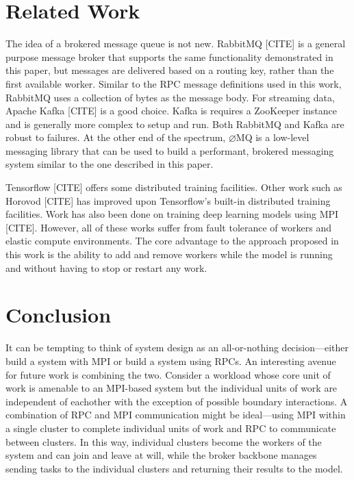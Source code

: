 \documentclass[conference]{IEEEtran}
\begin{document}
\section{Related Work}
The idea of a brokered message queue is not new. RabbitMQ [CITE] is a general
purpose message broker that supports the same functionality demonstrated
in this paper, but messages are delivered based on a routing key, rather than
the first available worker. Similar to the RPC message definitions used in
this work, RabbitMQ uses a collection of bytes as the message body. For
streaming data, Apache Kafka [CITE] is a good choice. Kafka is requires a
ZooKeeper \cite{Hunt:2010:ZWC:1855840.1855851} instance and is generally
more complex to setup and run.
Both RabbitMQ and Kafka are robust to failures. At the other end of the
spectrum, $\varnothing$MQ is a low-level messaging library that can be used
to build a performant, brokered messaging system similar to the one described
in this paper.

Tensorflow [CITE] offers some distributed training facilities. Other work such
as Horovod [CITE] has improved upon Tensorflow's built-in distributed training
facilities. Work has also been done on training deep learning models using
MPI [CITE]. However, all of these works suffer from fault tolerance of workers
and elastic compute environments. The core advantage to the approach proposed
in this work is the ability to add and remove workers while the model is
running and without having to stop or restart any work.

\section{Conclusion}
It can be tempting to think of system design as an all-or-nothing
decision---either build a system with MPI or build a system using RPCs. An
interesting avenue for future work is combining the two. Consider a workload
whose core unit of work is amenable to an MPI-based system but the individual
units of work are independent of eachother with the exception of possible
boundary interactions. A combination of RPC and MPI communication might be
ideal---using MPI within a single cluster to complete individual units of work
and RPC to communicate between clusters. In this way, individual clusters become
the workers of the system and can join and leave at will, while the broker
backbone manages sending tasks to the individual clusters and returning their
results to the model.



\end{document}
